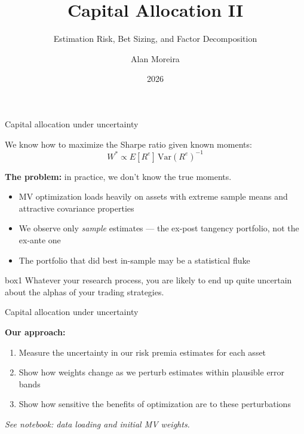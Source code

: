 \documentclass[aspectratio=169,10pt]{beamer}
\title{Capital Allocation II}
\subtitle{Estimation Risk, Bet Sizing, and Factor Decomposition}
\author[Moreira]{Alan Moreira}
\institute[UG54]{UG54}
\date{2026}
\begin{document}
\begin{frame}
\titlepage
\end{frame}


\begin{frame}{Capital allocation under uncertainty}

We know how to maximize the Sharpe ratio given known moments:
$$W^* \propto E[R^e] \, \text{Var}(R^e)^{-1}$$

\vskip 10pt

\textbf{The problem:} in practice, we don't know the true moments.

\vskip 8pt

\begin{itemize}
\item MV optimization loads heavily on assets with extreme sample means and attractive covariance properties
\vskip 6pt
\item We observe only \textit{sample} estimates --- the ex-post tangency portfolio, not the ex-ante one
\vskip 6pt
\item The portfolio that did best in-sample may be a statistical fluke
\end{itemize}

\vskip 10pt

\begin{beamercolorbox}[rounded=true,sep=8pt]{box1}
Whatever your research process, you are likely to end up quite uncertain about the alphas of your trading strategies.
\end{beamercolorbox}

\end{frame}


\begin{frame}{Capital allocation under uncertainty}

\textbf{Our approach:}

\vskip 8pt

\begin{enumerate}
\item Measure the uncertainty in our risk premia estimates for each asset
\vskip 6pt
\item Show how weights change as we perturb estimates within plausible error bands
\vskip 6pt
\item Show how sensitive the benefits of optimization are to these perturbations
\end{enumerate}

\vskip 10pt

\textit{See notebook: data loading and initial MV weights.}

\end{frame}
\end{document}
